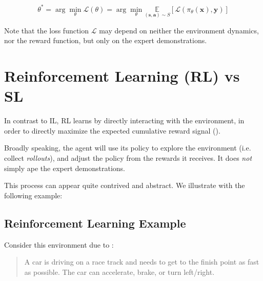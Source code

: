 \documentclass{article} %
\begin{document}
\begin{equation} \label {il_obj}
    \theta^* = \arg\min_\theta \mathcal{L}(\theta) = \arg\min_\theta \underset{(\mathbf{s}, \mathbf{a}) \sim S}{\mathbb{E}}[\mathcal{L}(\pi_\theta(\mathbf{x}), \mathbf{y})]
\end{equation}

Note that the loss function $\mathcal{L}$ may depend on neither the environment dynamics,
nor the reward function, but only on the expert demonstrations.

\section{Reinforcement Learning (RL) vs SL}

In contrast to IL, RL learns by directly interacting with the environment,
in order to directly maximize the expected cumulative reward signal (\cite{Sutton-and-Barto-1998}).

Broadly speaking, the agent will use its policy to explore the environment (i.e. collect \textit{rollouts}),
and adjust the policy from the rewards it receives. It does \textit{not} simply ape the expert demonstrations.

This process can appear quite contrived and abstract. We illustrate with the following example:

\subsection{Reinforcement Learning Example}
Consider this environment due to \cite{Towers-et-al-2024}:
\begin{quote}
    A car is driving on a race track and needs to get to the finish point
    as fast as possible. The car can accelerate, brake, or turn left/right.
\end{quote}
\end{document}
